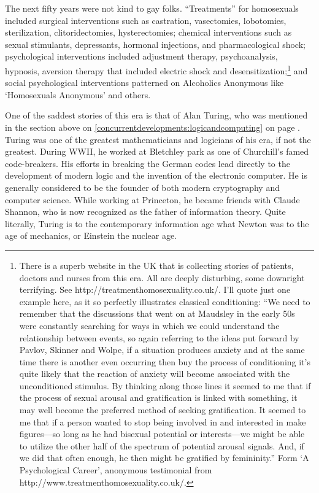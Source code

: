 \begin{refsection}
The next fifty years were not kind to gay folks. ``Treatments'' for homosexuals included surgical interventions such as castration, vasectomies, lobotomies, sterilization, clitoridectomies, hysterectomies; chemical interventions such as sexual stimulants, depressants, hormonal injections, and pharmacological shock; psychological interventions included adjustment therapy, psychoanalysis, hypnosis, aversion therapy that included electric shock and desensitization;\footnote{There is a superb website in the UK that is collecting stories of patients, doctors and nurses from this era. All are deeply disturbing, some downright terrifying. See http:\slash \slash treatmenthomosexuality.co.uk\slash . I'll quote just one example here, as it so perfectly illustrates classical conditioning:
``We need to remember that the discussions that went on at Maudsley in the early 50s were constantly searching for ways in which we could understand the relationship between events, so again referring to the ideas put forward by Pavlov, Skinner and Wolpe, if a situation produces anxiety and at the same time there is another even occurring then buy the process of conditioning it's quite likely that the reaction of anxiety will become associated with the unconditioned stimulus. By thinking along those lines it seemed to me that if the process of sexual arousal and gratification is linked with something, it may well become the preferred method of seeking gratification. It seemed to me that if a person wanted to stop being involved in and interested in make figures---so long as he had bisexual potential or interests---we might be able to utilize the other half of the spectrum of potential arousal signals. And, if we did that often enough, he then might be gratified by femininity.''
Form `A Psychological Career', anonymous testimonial from http:\slash \slash www.treatmenthomosexuality.co.uk\slash .} and social psychological interventions patterned on Alcoholics Anonymous like `Homosexuals Anonymous' and others.

One of the saddest stories of this era is that of Alan Turing, who was mentioned in the section above on \ref{concurrentdevelopments:logicandcomputing} on page \pageref{concurrentdevelopments:logicandcomputing}. Turing was one of the greatest mathematicians and logicians of his era, if not the greatest. During WWII, he worked at Bletchley park as one of Churchill's famed code-breakers. His efforts in breaking the German codes lead directly to the development of modern logic and the invention of the electronic computer. He is generally considered to be the founder of both modern cryptography and computer science. While working at Princeton, he became friends with Claude Shannon, who is now recognized as the father of information theory. Quite literally, Turing is to the contemporary information age what Newton was to the age of mechanics, or Einstein the nuclear age.


\end{refsection}
